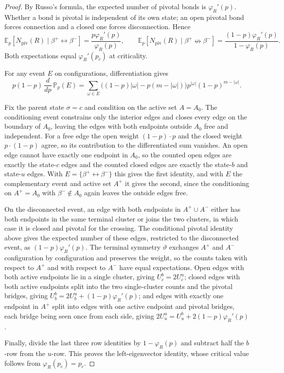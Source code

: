 \documentclass[scheme=plain,11pt]{ctexart}
\theoremstyle{definition}
\theoremstyle{remark}
\begin{document}
\begin{proof}
By Russo's formula, the expected number of pivotal bonds is $\varphi_R'(p)$.
Whether a bond is pivotal is independent of its own state; an open pivotal bond forces connection and a closed one forces disconnection. Hence
\[
 \mathbb E_p[N_{\mathrm{piv}}(R)\mid\beta^+\leftrightarrow\beta^-]
 =\frac{p\varphi_R'(p)}{\varphi_R(p)},\qquad
 \mathbb E_p[N_{\mathrm{piv}}(R)\mid\beta^+\nleftrightarrow\beta^-]
 =\frac{(1-p)\varphi_R'(p)}{1-\varphi_R(p)}.
\]
Both expectations equal $\varphi_R'(p_c)$ at criticality.


For any event $E$ on configurations, differentiation gives
\[
   p(1-p)\,\frac{d}{dp}\,\mathbb P_p(E)
   =\sum_{\omega\in E}
   \bigl((1-p)|\omega|-p(m-|\omega|)\bigr)
   p^{|\omega|}(1-p)^{m-|\omega|}.
\]

Fix the parent state $\sigma=c$ and condition on the active set $A=A_0$.
The conditioning event constrains only the interior edges and closes every edge on the boundary of $A_0$, leaving the edges with both endpoints outside $A_0$ free and independent.
For a free edge the open weight $(1-p)\cdot p$ and the closed weight $p\cdot(1-p)$ agree, so its contribution to the differentiated sum vanishes.
An open edge cannot have exactly one endpoint in $A_0$, so the counted open edges are exactly the state-$c$ edges and the counted closed edges are exactly the state-$b$ and state-$u$ edges.
With $E=\{\beta^+\leftrightarrow\beta^-\}$ this gives the first identity, and with $E$ the complementary event and active set $A^{+}$ it gives the second, since the conditioning on $A^{+}=A_0$ with $\beta^-\notin A_0$ again leaves the outside edges free.

On the disconnected event, an edge with both endpoints in $A^{+}\cup A^{-}$ either has both endpoints in the same terminal cluster or joins the two clusters, in which case it is closed and pivotal for the crossing.
The conditional pivotal identity above gives the expected number of these edges, restricted to the disconnected event, as $(1-p)\varphi_R'(p)$.
The terminal symmetry $\vartheta$ exchanges $A^{+}$ and $A^{-}$ configuration by configuration and preserves the weight, so the counts taken with respect to $A^{+}$ and with respect to $A^{-}$ have equal expectations.
Open edges with both active endpoints lie in a single cluster, giving $U^{b}_{c}=2U^{u}_{c}$; closed edges with both active endpoints split into the two single-cluster counts and the pivotal bridges, giving $U^{b}_{b}=2U^{u}_{b}+(1-p)\varphi_R'(p)$; and edges with exactly one endpoint in $A^{+}$ split into edges with one active endpoint and pivotal bridges, each bridge being seen once from each side, giving $2U^{u}_{u}=U^{b}_{u}+2(1-p)\varphi_R'(p)$.

Finally, divide the last three row identities by $1-\varphi_R(p)$ and subtract half the $b$-row from the $u$-row.
This proves the left-eigenvector identity, whose critical value follows from $\varphi_R(p_c)=p_c$.
\end{proof}
\end{document}
